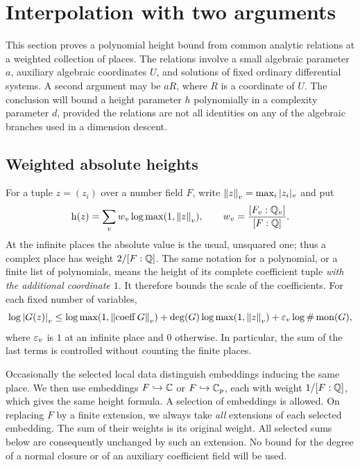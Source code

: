 \section{Interpolation with two arguments}\label{sec:interpolation}

This section proves a polynomial height bound from common analytic
relations at a weighted collection of places.  The relations involve a
small algebraic parameter $a$, auxiliary algebraic coordinates $U$, and
solutions of fixed ordinary differential systems.  A second argument may
be $aR$, where $R$ is a coordinate of $U$.  The conclusion will bound a
height parameter $h$ polynomially in a complexity parameter $d$, provided
the relations are not all identities on any of the algebraic branches
used in a dimension descent.

\subsection{Weighted absolute heights}

For a tuple $z=(z_i)$ over a number field $F$, write
$\left\lVert z\right\rVert_v=\max_i|z_i|_v$ and put
\[
 \mathrm h\!\left(z\right)=\sum_v w_v\log\max(1,\left\lVert z\right\rVert_v),
 \qquad w_v=\frac{[F_v:\mathbb Q_v]}{[F:\mathbb Q]}.
\]
At the infinite places the absolute value is the usual, unsquared one;
thus a complex place has weight $2/[F:\mathbb Q]$.  The same notation for a
polynomial, or a finite list of polynomials, means the height of its
complete coefficient tuple \emph{with the additional coordinate $1$}.
It therefore bounds the scale of the coefficients.  For each fixed
number of variables,
\begin{equation}\label{eq:polynomial-evaluation}
 \log\left\lvert G(z)\right\rvert_v
 \leq \log\max(1,\left\lVert\operatorname{coeff}G\right\rVert_v)
       +\deg(G)\log\max(1,\left\lVert z\right\rVert_v)
       +\varepsilon_v\log\#\operatorname{mon}(G),
\end{equation}
where $\varepsilon_v$ is $1$ at an infinite place and $0$ otherwise.
In particular, the sum of the last terms is controlled without counting
the finite places.

Occasionally the selected local data distinguish embeddings inducing the
same place.  We then use embeddings $F\hookrightarrow\mathbb C$ or
$F\hookrightarrow\mathbb C_p$, each with weight $1/[F:\mathbb Q]$, which gives the
same height formula.  A selection of embeddings is allowed.  On replacing
$F$ by a finite extension, we always take \emph{all} extensions of each
selected embedding.  The sum of their weights is its original weight.
All selected sums below are consequently unchanged by such an extension.
No bound for the degree of a normal closure or of an auxiliary coefficient
field will be used.

